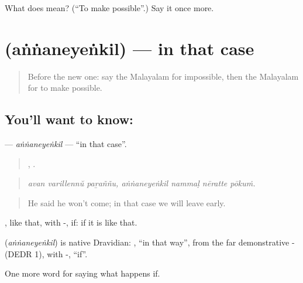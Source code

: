 \begin{tcolorbox}[breakable,colback=teal!4,colframe=teal!35!black,title={Before you move on}]
What does  mean? (\textquotedblleft{}To make possible\textquotedblright{}.) Say it once more.
\end{tcolorbox}
\section[\texorpdfstring{\ml{അങ്ങനെയെങ്കിൽ} (aṅṅaneyeṅkil)}{അങ്ങനെയെങ്കിൽ (aṅṅaneyeṅkil)}]{ (aṅṅaneyeṅkil) — in that case}

\label{lesson:ML-C441-annaneyenkil}



\begin{quote}
Before the new one: say the Malayalam for impossible, then the Malayalam for to make possible.
\end{quote}

\subsection*{You'll want to know: }
\textbf{} — \emph{aṅṅaneyeṅkil} — \textquotedblleft{}in that case\textquotedblright{}.

\begin{quote}
  ,    .
\end{quote}

\begin{quote}
\emph{avan varillennŭ paṟaññu, aṅṅaneyeṅkil nammaḷ nēratte pōkuṁ.}
\end{quote}

\begin{quote}
He said he won't come; in that case we will leave early.
\end{quote}

, like that, with -, if: if it is like that.

\begin{cousinweb}
\textbf{} (\emph{aṅṅaneyeṅkil}) is native Dravidian: , \textquotedblleft{}in that way\textquotedblright{}, from the far demonstrative - (DEDR 1), with -, \textquotedblleft{}if\textquotedblright{}.
\end{cousinweb}

\begin{grammarlens}[title={What you've built}]
One more word for saying what happens if.
\end{grammarlens}

